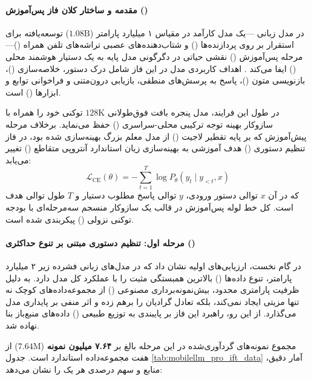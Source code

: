 \item {}

\paragraph*{مقدمه و ساختار کلان فاز پس‌آموزش ()}
در مدل زبانی —یک مدل کارآمد در مقیاس ۱ میلیارد پارامتر ($1.08\text{B}$) توسعه‌یافته برای استقرار بر روی پردازنده‌ها () و شتاب‌دهنده‌های عصبی تراشه‌های تلفن همراه ()—مرحله پس‌آموزش () نقشی حیاتی در دگرگونی مدل پایه به یک دستیار هوشمند محلی () ایفا می‌کند \cite{huber2025mobilellmpro}. اهداف کاربردی مدل در این فاز شامل درک دستور، خلاصه‌سازی ()، بازنویسی متون ()، پاسخ به پرسش‌های منطقی، بازیابی درون‌متنی و فراخوانی توابع و ابزارها () است.

در طول این فرایند، مدل پنجره بافت فوق‌طولانی $128\text{K}$ توکنی خود را همراه با سازوکار بهینه توجه ترکیبی محلی-سراسری () حفظ می‌نماید. برخلاف مرحله پیش‌آموزش که بر پایه تقطیر لاجیت () از مدل معلم بزرگ  بهینه‌سازی شده بود، در فاز تنظیم دستوری () هدف آموزشی به بهینه‌سازی زیان استاندارد آنتروپی متقاطع () تغییر می‌یابد:
\begin{equation}
    \mathcal{L}_{\text{CE}}(\theta) = - \sum_{t=1}^{T} \log P_\theta(y_t \mid y_{<t}, x)
\end{equation}
که در آن $x$ توالی دستور ورودی، $y$ توالی پاسخ مطلوب دستیار و $T$ طول توالی هدف است. کل خط لوله پس‌آموزش در قالب یک سازوکار منسجم سه‌مرحله‌ای با بودجه توکنی نزولی () پیکربندی شده است.

\paragraph*{مرحله اول: تنظیم دستوری مبتنی بر تنوع حداکثری ()}
در گام نخست، ارزیابی‌های اولیه نشان داد که در مدل‌های زبانی فشرده زیر ۲ میلیارد پارامتر، تنوع داده‌ها () بالاترین همبستگی مثبت را با عملکرد کل مدل دارد. به دلیل ظرفیت پارامتری محدود، بیش‌نمونه‌برداری مصنوعی () از مجموعه‌داده‌های کوچک نه تنها مزیتی ایجاد نمی‌کند، بلکه تعادل گرادیان را برهم زده و اثر منفی بر پایداری مدل می‌گذارد. از این رو، راهبرد این فاز بر پایبندی به توزیع طبیعی () داده‌های منبع‌باز بنا نهاده شد.

مجموع نمونه‌های گردآوری‌شده در این مرحله بالغ بر \textbf{۷.۶۴ میلیون نمونه} ($7.64\text{M}$) از هفت مجموعه‌داده استاندارد است. جدول \ref{tab:mobilellm_pro_ift_data} آمار دقیق، منابع و سهم درصدی هر یک را نشان می‌دهد:

